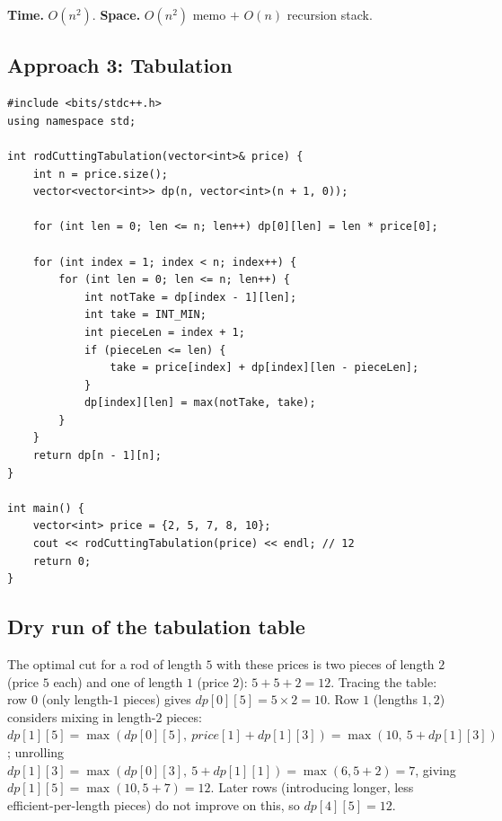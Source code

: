 \begin{complexitybox}
\textbf{Time.} $O(n^2)$.
\textbf{Space.} $O(n^2)$ memo $+$ $O(n)$ recursion stack.
\end{complexitybox}

\subsection*{Approach 3: Tabulation}

\begin{lstlisting}
#include <bits/stdc++.h>
using namespace std;

int rodCuttingTabulation(vector<int>& price) {
    int n = price.size();
    vector<vector<int>> dp(n, vector<int>(n + 1, 0));

    for (int len = 0; len <= n; len++) dp[0][len] = len * price[0];

    for (int index = 1; index < n; index++) {
        for (int len = 0; len <= n; len++) {
            int notTake = dp[index - 1][len];
            int take = INT_MIN;
            int pieceLen = index + 1;
            if (pieceLen <= len) {
                take = price[index] + dp[index][len - pieceLen];
            }
            dp[index][len] = max(notTake, take);
        }
    }
    return dp[n - 1][n];
}

int main() {
    vector<int> price = {2, 5, 7, 8, 10};
    cout << rodCuttingTabulation(price) << endl; // 12
    return 0;
}
\end{lstlisting}

\subsection*{Dry run of the tabulation table}


The optimal cut for a rod of length $5$ with these prices is two pieces
of length $2$ (price $5$ each) and one of length $1$ (price $2$):
$5+5+2=12$. Tracing the table: row $0$ (only length-$1$ pieces) gives
$\textit{dp}[0][5]=5\times2=10$. Row $1$ (lengths $1,2$) considers
mixing in length-$2$ pieces: $\textit{dp}[1][5] =
\max(\textit{dp}[0][5],\ \textit{price}[1]+\textit{dp}[1][3]) =
\max(10,\ 5+\textit{dp}[1][3])$; unrolling $\textit{dp}[1][3] =
\max(\textit{dp}[0][3],\ 5+\textit{dp}[1][1]) = \max(6, 5+2)=7$, giving
$\textit{dp}[1][5] = \max(10, 5+7)=12$. Later rows (introducing longer,
less efficient-per-length pieces) do not improve on this, so
$\textit{dp}[4][5]=12$.


